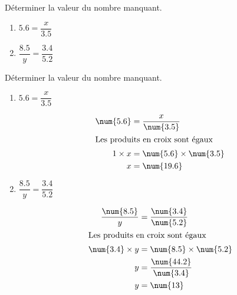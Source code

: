 \begin{exercice*}
    Déterminer la valeur du nombre manquant.
    \begin{enumerate}
        \item $\num{5.6}=\dfrac{x}{\num{3.5}}$
        \smallskip
        \item $\dfrac{\num{8.5}}{y}=\dfrac{\num{3.4}}{\num{5.2}}$
    \end{enumerate}
\end{exercice*}
\begin{corrige}
    Déterminer la valeur du nombre manquant.\\\smallskip
    \begin{enumerate}
        \item $\num{5.6}=\dfrac{x}{\num{3.5}}$
        
        {\red        
        \begin{align*}
            \num{5.6} &=\dfrac{x}{\num{3.5}}\\
            \intertext{\centering Les produits en croix sont égaux}
            1\times x &= \num{5.6}\times\num{3.5}\\
            x &= \num{19.6}
        \end{align*}
        }
        \smallskip
        \item $\dfrac{\num{8.5}}{y}=\dfrac{\num{3.4}}{\num{5.2}}$
        
        {\red        
        \begin{align*}
            \dfrac{\num{8.5}}{y}&=\dfrac{\num{3.4}}{\num{5.2}}\\
            \intertext{\centering Les produits en croix sont égaux}
            \num{3.4}\times y &= \num{8.5}\times\num{5.2}\\
            y &= \dfrac{\num{44.2}}{\num{3.4}}\\
            y &= \num{13}
        \end{align*}
        }
    \end{enumerate}
\end{corrige}

